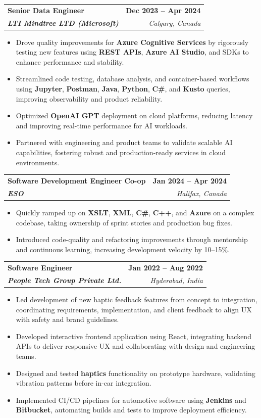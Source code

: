 \documentclass[letterpaper,11pt]{article}
\makeatletter
\newcommand{\resumeItem}[1]{
  \item\small{
    {#1 \vspace{-2pt}}
  }
}
\newcommand{\resumeSubheading}[4]{
  \vspace{-2pt}\item
    \begin{tabular*}{1.0\textwidth}[t]{l@{\extracolsep{\fill}}r}
      \textbf{#1} & \textbf{\small #2} \\
      \textit{\small#3} & \textit{\small #4} \\
    \end{tabular*}\vspace{-7pt}
}
\newcommand{\resumeItemListStart}{\begin{itemize}}
\newcommand{\resumeItemListEnd}{\end{itemize}\vspace{-5pt}}
\makeatother
\begin{document}
    \resumeSubheading
      {\textbf{Senior Data Engineer}}{\textbf{Dec 2023 -- Apr 2024}}
      {\textbf{LTI Mindtree LTD (Microsoft)}}{Calgary, Canada}
      \resumeItemListStart
        \resumeItem{Drove quality improvements for \textbf{Azure Cognitive Services} by rigorously testing new features using \textbf{REST APIs}, \textbf{Azure AI Studio}, and SDKs to enhance performance and stability.}
        \resumeItem{Streamlined code testing, database analysis, and container-based workflows using \textbf{Jupyter}, \textbf{Postman}, \textbf{Java}, \textbf{Python}, \textbf{C\#}, and \textbf{Kusto} queries, improving observability and product reliability.}
        \resumeItem{Optimized \textbf{OpenAI GPT} deployment on cloud platforms, reducing latency and improving real-time performance for AI workloads.}
        \resumeItem{Partnered with engineering and product teams to validate scalable AI capabilities, fostering robust and production-ready services in cloud environments.}
      \resumeItemListEnd
    
    \resumeSubheading
      {\textbf{Software Development Engineer Co-op}}{\textbf{Jan 2024 -- Apr 2024}}
      {\textbf{ESO}}{Halifax, Canada}
      \resumeItemListStart
        \resumeItem{Quickly ramped up on \textbf{XSLT}, \textbf{XML}, \textbf{C\#}, \textbf{C++}, and \textbf{Azure} on a complex codebase, taking ownership of sprint stories and production bug fixes.}
        \resumeItem{Introduced code-quality and refactoring improvements through mentorship and continuous learning, increasing development velocity by 10--15\%.}
      \resumeItemListEnd

    \resumeSubheading
      {\textbf{Software Engineer}}{\textbf{Jan 2022 -- Aug 2022}}
      {\textbf{People Tech Group Private Ltd.}}{Hyderabad, India}
      \resumeItemListStart
        \resumeItem{Led development of new haptic feedback features from concept to integration, coordinating requirements, implementation, and client feedback to align UX with safety and brand guidelines.}
        \resumeItem{Developed interactive frontend application using React, integrating backend APIs to deliver responsive UX and collaborating with design and engineering teams.}
        \resumeItem{Designed and tested \textbf{haptics} functionality on prototype hardware, validating vibration patterns before in-car integration.}
        \resumeItem{Implemented CI/CD pipelines for automotive software using \textbf{Jenkins} and \textbf{Bitbucket}, automating builds and tests to improve deployment efficiency.}
      \resumeItemListEnd
\end{document}
